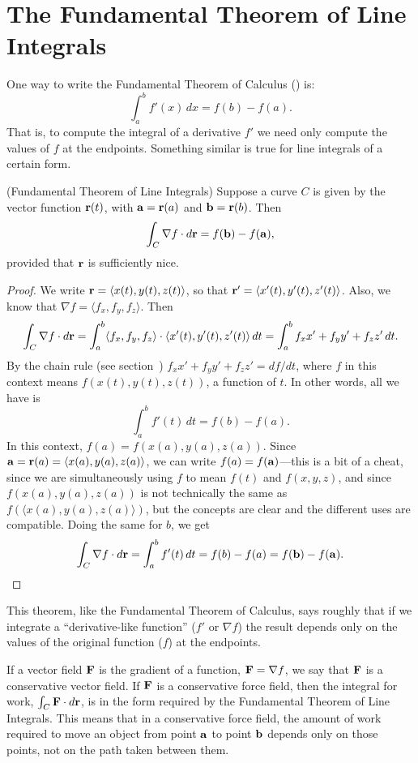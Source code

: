 \section{The Fundamental Theorem of Line Integrals}{}{}

One way to write the Fundamental Theorem of Calculus
() is:
$$\int_a^b f'(x)\,dx = f(b)-f(a).$$
That is, to compute the integral of a derivative $f'$ 
we need only compute the values of $f$ at the endpoints. Something
similar is true for line integrals of a certain form.

\begin{theorem} (Fundamental Theorem of Line Integrals) Suppose a curve $C$ is
given by the vector function ${\bf r}(t)$, with ${\bf a}={\bf r}(a)$
and ${\bf b}={\bf r}(b)$. Then
$$\int_C \nabla f\cdot d{\bf r} = f({\bf b})-f({\bf a}),$$
provided that $\bf r$ is sufficiently nice.
\begin{proof}

We write ${\bf r}=\langle x(t),y(t),z(t)\rangle$, so 
that ${\bf r}'=\langle x'(t),y'(t),z'(t)\rangle$. Also,
we know that $\nabla f=\langle f_x,f_y,f_z\rangle$. Then
$$\int_C \nabla f\cdot d{\bf r} = 
\int_a^b \langle f_x,f_y,f_z\rangle\cdot\langle
x'(t),y'(t),z'(t)\rangle\,dt=
\int_a^b f_x x'+f_y y'+f_z z' \,dt.$$
By the chain rule (see section~)
$f_x x'+f_y y'+f_z z'=df/dt$, where $f$ in this context means
$f(x(t),y(t),z(t))$, a function of $t$. In other words, all we have is
$$\int_a^b f'(t)\,dt=f(b)-f(a).$$
In this context,
$f(a)=f(x(a),y(a),z(a))$.
Since ${\bf a}={\bf r}(a)=\langle x(a),y(a),z(a)\rangle$, we can
write $f(a)=f({\bf a})$---this is a bit of a cheat, since we are
simultaneously using $f$ to mean $f(t)$ and $f(x,y,z)$, and since
$f(x(a),y(a),z(a))$ is not technically the same as 
$f(\langle x(a),y(a),z(a)\rangle)$,
but the
concepts are clear and the different uses are compatible. Doing the
same for $b$, we get
$$\int_C \nabla f\cdot d{\bf r} = \int_a^b f'(t)\,dt=f(b)-f(a)=f({\bf
  b})-f({\bf a}).$$ 
\vglue-20pt\end{proof}

This theorem, like the Fundamental Theorem of Calculus, says roughly
that if we integrate a ``derivative-like function'' ($f'$ or $\nabla
f$) the result depends only on the values of the original function ($f$)
at the endpoints.

If a vector field $\bf F$ is the gradient of a function, ${\bf
  F}=\nabla f$, we say that $\bf F$ is a {\dfont conservative
vector field}. If $\bf F$ is a
conservative force field, then the integral for work,
$\int_C {\bf F}\cdot d{\bf r}$, is in the form required by the
Fundamental Theorem of Line Integrals. This means that in a
conservative force field, the amount of work required to move an
object from point $\bf a$ to point $\bf b$ depends only on those
points, not on the path taken between them.


\end{theorem}
